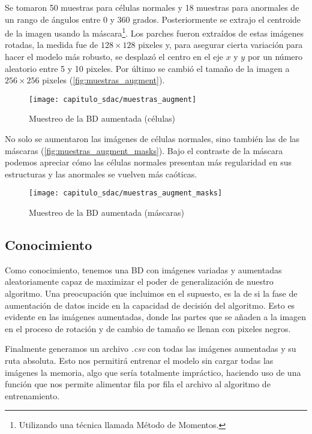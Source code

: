Se tomaron 50 muestras para células normales y 18 muestras para anormales de un
rango de ángulos entre 0 y 360 grados. Posteriormente se extrajo el centroide de
la imagen usando la máscara\footnote{Utilizando una técnica llamada Método de
Momentos.}. Los parches fueron extraídos de estas imágenes rotadas, la medida fue
de \(128 \times 128\) pixeles y, para asegurar cierta variación para hacer el
modelo más robusto, se desplazó el centro en el eje \(x\) y \(y\) por un número
aleatorio entre 5 y 10 pixeles. Por último se cambió el tamaño de la imagen a
\(256 \times 256\) pixeles (\autoref{fig:muestras_augment}). 
  
\begin{figure}[]
    \centering
    \texttt{[image: capitulo\_sdac/muestras\_augment]}
    \caption{Muestreo de la BD aumentada (células)}\label{fig:muestras_augment}
\end{figure}

No solo se aumentaron las imágenes de células normales, sino también las de las
máscaras (\autoref{fig:muestras_augment_masks}). Bajo el contraste de la máscara
podemos apreciar cómo las células normales presentan más regularidad en sus
estructuras y las anormales se vuelven más caóticas.

\begin{figure}[]
    \centering
    \texttt{[image: capitulo\_sdac/muestras\_augment\_masks]}
    \caption{Muestreo de la BD aumentada (máscaras)}\label{fig:muestras_augment_masks}
\end{figure}

\subsection{Conocimiento}

Como conocimiento, tenemos una BD con imágenes variadas y aumentadas
aleatoriamente capaz de maximizar el poder de generalización de nuestro
algoritmo. Una preocupación que incluimos en el supuesto, es la de si la fase de
aumentación de datos incide en la capacidad de decisión del algoritmo. Esto es
evidente en las imágenes aumentadas, donde las partes que se añaden a la imagen
en el proceso de rotación y de cambio de tamaño se llenan con pixeles negros. 

Finalmente generamos un archivo \emph{.csv} con todas las imágenes aumentadas y su ruta
absoluta. Esto nos permitirá entrenar el modelo sin cargar todas las imágenes la
memoria, algo que sería totalmente impráctico, haciendo uso de una función que
nos permite alimentar fila por fila el archivo al algoritmo de entrenamiento.
